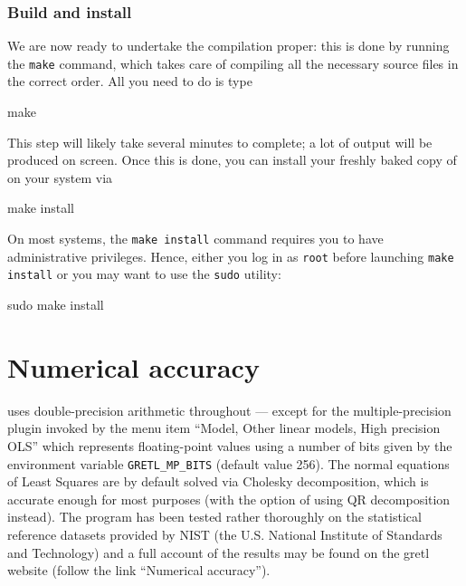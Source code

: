 

\subsection{Build and install}

We are now ready to undertake the compilation proper: this is done by
running the \texttt{make} command, which takes care of compiling all
the necessary source files in the correct order. All you need to do is
type
\begin{code}
make 
\end{code}

This step will likely take several minutes to complete; a lot of
output will be produced on screen. Once this is done, you can install
your freshly baked copy of  on your system via
\begin{code}
make install
\end{code}

On most systems, the \texttt{make install} command requires you to
have administrative privileges.  Hence, either you log in as
\texttt{root} before launching \texttt{make install} or you may want
to use the \texttt{sudo} utility:
\begin{code}
sudo make install
\end{code}


\chapter{Numerical accuracy}
\label{app-accuracy}

 uses double-precision arithmetic throughout --- except for
the multiple-precision plugin invoked by the menu item ``Model, Other
linear models, High precision OLS'' which represents floating-point
values using a number of bits given by the environment variable
\verb+GRETL_MP_BITS+ (default value 256).  The normal equations of
Least Squares are by default solved via Cholesky decomposition, which
is accurate enough for most purposes (with the option of using QR
decomposition instead).  The program has been tested rather thoroughly
on the statistical reference datasets provided by NIST (the U.S.
National Institute of Standards and Technology) and a full account of
the results may be found on the gretl website (follow the link
``Numerical accuracy'').

